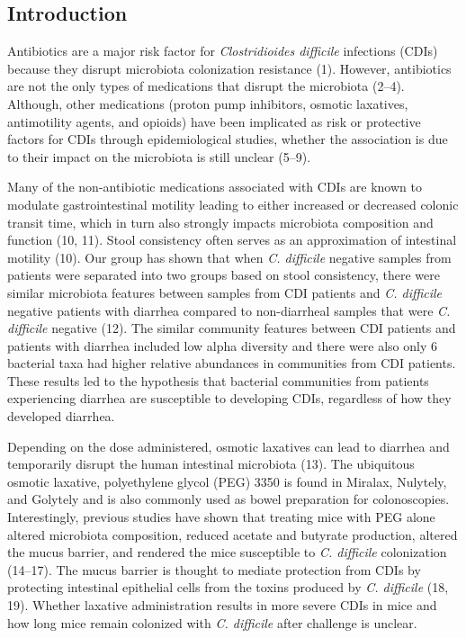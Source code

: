 \documentclass[
  11pt,
]{article}
\begin{document}
\newpage

\hypertarget{introduction}{%
\subsection{Introduction}\label{introduction}}

Antibiotics are a major risk factor for \emph{Clostridioides difficile}
infections (CDIs) because they disrupt microbiota colonization
resistance (1). However, antibiotics are not the only types of
medications that disrupt the microbiota (2--4). Although, other
medications (proton pump inhibitors, osmotic laxatives, antimotility
agents, and opioids) have been implicated as risk or protective factors
for CDIs through epidemiological studies, whether the association is due
to their impact on the microbiota is still unclear (5--9).

Many of the non-antibiotic medications associated with CDIs are known to
modulate gastrointestinal motility leading to either increased or
decreased colonic transit time, which in turn also strongly impacts
microbiota composition and function (10, 11). Stool consistency often
serves as an approximation of intestinal motility (10). Our group has
shown that when \emph{C. difficile} negative samples from patients were
separated into two groups based on stool consistency, there were similar
microbiota features between samples from CDI patients and \emph{C.
difficile} negative patients with diarrhea compared to non-diarrheal
samples that were \emph{C. difficile} negative (12). The similar
community features between CDI patients and patients with diarrhea
included low alpha diversity and there were also only 6 bacterial taxa
had higher relative abundances in communities from CDI patients. These
results led to the hypothesis that bacterial communities from patients
experiencing diarrhea are susceptible to developing CDIs, regardless of
how they developed diarrhea.

Depending on the dose administered, osmotic laxatives can lead to
diarrhea and temporarily disrupt the human intestinal microbiota (13).
The ubiquitous osmotic laxative, polyethylene glycol (PEG) 3350 is found
in Miralax, Nulytely, and Golytely and is also commonly used as bowel
preparation for colonoscopies. Interestingly, previous studies have
shown that treating mice with PEG alone altered microbiota composition,
reduced acetate and butyrate production, altered the mucus barrier, and
rendered the mice susceptible to \emph{C. difficile} colonization
(14--17). The mucus barrier is thought to mediate protection from CDIs
by protecting intestinal epithelial cells from the toxins produced by
\emph{C. difficile} (18, 19). Whether laxative administration results in
more severe CDIs in mice and how long mice remain colonized with
\emph{C. difficile} after challenge is unclear.
\end{document}
